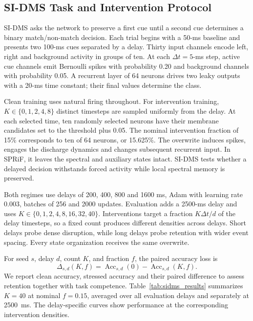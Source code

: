 \documentclass[letterpaper,journal]{IEEEtran}
\DeclareMathOperator{\Acc}{Acc}
\begin{document}
\subsection{SI-DMS Task and Intervention Protocol}
\label{sec:sidms}

SI-DMS asks the network to preserve a first cue until a second cue determines a binary match/non-match decision. Each trial begins with a 50-ms baseline and presents two 100-ms cues separated by a delay. Thirty input channels encode left, right and background activity in groups of ten. At each $\Delta t=5$-ms step, active cue channels emit Bernoulli spikes with probability 0.20 and background channels with probability 0.05. A recurrent layer of 64 neurons drives two leaky outputs with a 20-ms time constant; their final values determine the class.

Clean training uses natural firing throughout. For intervention training, $K\in\{0,1,2,4,8\}$ distinct timesteps are sampled uniformly from the delay. At each selected time, ten randomly selected neurons have their membrane candidates set to the threshold plus 0.05. The nominal intervention fraction of 15\% corresponds to ten of 64 neurons, or 15.625\%. The overwrite induces spikes, engages the discharge dynamics and changes subsequent recurrent input. In SPRiF, it leaves the spectral and auxiliary states intact. SI-DMS tests whether a delayed decision withstands forced activity while local spectral memory is preserved.

Both regimes use delays of 200, 400, 800 and 1600 ms, Adam with learning rate 0.003, batches of 256 and 2000 updates. Evaluation adds a 2500-ms delay and uses $K\in\{0,1,2,4,8,16,32,40\}$. Interventions target a fraction $K\Delta t/d$ of the delay timesteps, so a fixed count produces different densities across delays. Short delays probe dense disruption, while long delays probe retention with wider event spacing. Every state organization receives the same overwrite.

For seed $s$, delay $d$, count $K$, and fraction $f$, the paired accuracy loss is
\begin{equation}
\Delta_{s,d}(K,f)=
\Acc_{s,d}(0)-\Acc_{s,d}(K,f).
\label{eq:paired_loss}
\end{equation}
We report clean accuracy, stressed accuracy and their paired difference to assess retention together with task competence. Table~\ref{tab:sidms_results} summarizes $K=40$ at nominal $f=0.15$, averaged over all evaluation delays and separately at 2500~ms. The delay-specific curves show performance at the corresponding intervention densities.
\end{document}
